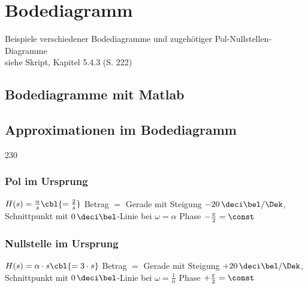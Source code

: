 \section{Bodediagramm}

Beispiele verschiedener Bodediagramme und zugehötiger Pol-Nullstellen-Diagramme \\
siehe Skript, Kapitel 5.4.3 (S. 222)


\subsection{Bodediagramme mit Matlab}




\subsection{Approximationen im Bodediagramm}{230}

\begin{minipage}[t]{0.48\columnwidth}
    \raggedright
    \subsubsection{Pol im Ursprung}

    \begin{outline}
        \1 $H(s) = \frac{\alpha}{s} \cbl{= \frac{2}{s}}$
            \2 Betrag $=$ Gerade mit Steigung $- 20 \, \deci \bel / \Dek$, Schnittpunkt mit $0 \, \deci\bel$-Linie bei $\omega = \alpha$
            \2 Phase $- \frac{\pi}{2} = \const$
    \end{outline}
\end{minipage}
\hfill
\begin{minipage}[t]{0.48\columnwidth}
    \raggedright
    \subsubsection{Nullstelle im Ursprung}

    \begin{outline}
        \1 $H(s) = \alpha \cdot s \cbl{= 3\cdot s}$
            \2 Betrag $=$ Gerade mit Steigung $+ 20 \, \deci \bel / \Dek$, Schnittpunkt mit $0 \, \deci\bel$-Linie bei $\omega = \frac{1}{\alpha}$
            \2 Phase $+ \frac{\pi}{2} = \const$
    \end{outline}
\end{minipage}

\begin{minipage}[t]{0.48\columnwidth}
    
\end{minipage}
\hfill
\begin{minipage}[t]{0.48\columnwidth}
    
\end{minipage}


